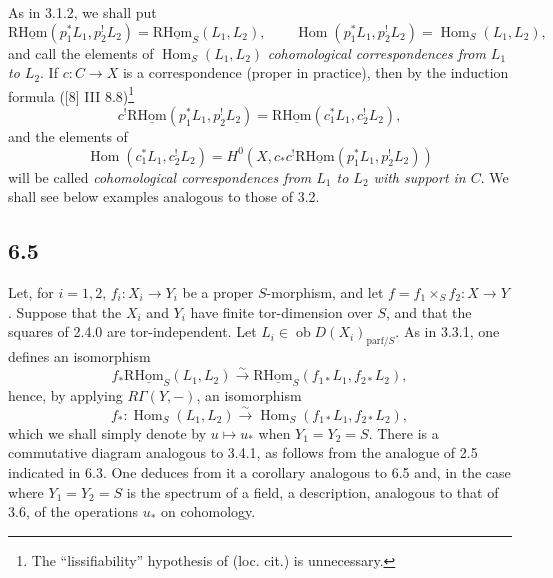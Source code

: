\documentclass[11pt]{article}
\DeclareMathOperator{\Hom}{Hom}
\providecommand{\Hom}{\operatorname{Hom}}
\providecommand{\Hom}{\operatorname{Hom}}
\begin{document}
As in 3.1.2, we shall put
\begin{equation}
\tag{6.4.3}
\mathrm{R}\underline{\mathrm{Hom}}(p_1^*L_1,p_2^!L_2)=\mathrm{R}\underline{\mathrm{Hom}}_S(L_1,L_2),\qquad
\Hom(p_1^*L_1,p_2^!L_2)=\Hom_S(L_1,L_2),
\end{equation}
and call the elements of $\Hom_S(L_1,L_2)$ \emph{cohomological correspondences from $L_1$ to $L_2$}. If $c:C\to X$ is a correspondence (proper in practice), then by the induction formula ([8] III 8.8)\footnote{The ``lissifiability'' hypothesis of (loc. cit.) is unnecessary.}
\begin{equation}
\tag{6.4.4}
c^!\mathrm{R}\underline{\mathrm{Hom}}(p_1^*L_1,p_2^!L_2)=\mathrm{R}\underline{\mathrm{Hom}}(c_1^*L_1,c_2^!L_2),
\end{equation}
and the elements of
\[
\Hom(c_1^*L_1,c_2^!L_2)=H^0(X,c_*c^!\mathrm{R}\underline{\mathrm{Hom}}(p_1^*L_1,p_2^!L_2))
\]
will be called \emph{cohomological correspondences from $L_1$ to $L_2$ with support in $C$}. We shall see below examples analogous to those of 3.2.

\subsection*{6.5}
Let, for $i=1,2$, $f_i:X_i\to Y_i$ be a proper $S$-morphism, and let $f=f_1\times_Sf_2:X\to Y$. Suppose that the $X_i$ and $Y_i$ have finite tor-dimension over $S$, and that the squares of 2.4.0 are tor-independent. Let $L_i\in\operatorname{ob}D(X_i)_{\mathrm{parf}/S}$. As in 3.3.1, one defines an isomorphism
\begin{equation}
\tag{6.5.1}
f_*\mathrm{R}\underline{\mathrm{Hom}}_S(L_1,L_2)\xrightarrow{\sim}\mathrm{R}\underline{\mathrm{Hom}}_S(f_{1*}L_1,f_{2*}L_2),
\end{equation}
hence, by applying $R\Gamma(Y,-)$, an isomorphism
\begin{equation}
\tag{6.5.2}
f_*:\Hom_S(L_1,L_2)\xrightarrow{\sim}\Hom_S(f_{1*}L_1,f_{2*}L_2),
\end{equation}
which we shall simply denote by $u\mapsto u_*$ when $Y_1=Y_2=S$. There is a commutative diagram analogous to 3.4.1, as follows from the analogue of 2.5 indicated in 6.3. One deduces from it a corollary analogous to 6.5 and, in the case where $Y_1=Y_2=S$ is the spectrum of a field, a description, analogous to that of 3.6, of the operations $u_*$ on cohomology.
\end{document}
